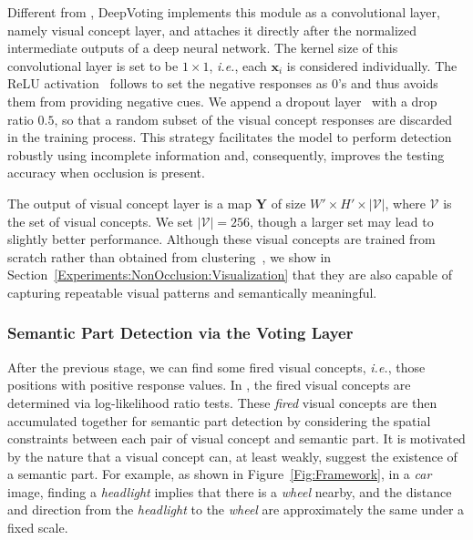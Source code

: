 \documentclass[10pt,twocolumn,letterpaper]{article}
\begin{document}
  Different from \cite{wang2017detecting}, DeepVoting implements this module as a convolutional layer, namely visual concept layer, and attaches it directly after the normalized intermediate outputs of a deep neural network. The kernel size of this convolutional layer is set to be $1\times1$, {\em i.e.}, each $\mathbf{x}_i$ is considered individually. The ReLU activation~\cite{Nair_2010_Rectified} follows to set the negative responses as $0$'s and thus avoids them from providing negative cues. We append a dropout layer~\cite{Srivastava_2014_Dropout} with a drop ratio $0.5$, so that a random subset of the visual concept responses are discarded in the training process.
  This strategy facilitates the model to perform detection robustly using incomplete information and, consequently, improves the testing accuracy when occlusion is present.

  The output of visual concept layer is a map $\mathbf{Y}$ of size $W'\times H'\times\left|\mathcal{V}\right|$, where $\mathcal{V}$ is the set of visual concepts. We set ${\left|\mathcal{V}\right|}={256}$, though a larger set may lead to slightly better performance. Although these visual concepts are trained from scratch rather than obtained from clustering~\cite{Wang_2017_VC_journal}, we show in Section~\ref{Experiments:NonOcclusion:Visualization} that they are also capable of capturing repeatable visual patterns and semantically meaningful.


  \subsubsection{Semantic Part Detection via the Voting Layer}
  \label{Framework:Formulation:Voting}

  After the previous stage, we can find some fired visual concepts, {\em i.e.}, those positions with positive response values. In \cite{wang2017detecting}, the fired visual concepts are determined via log-likelihood ratio tests. These {\em fired} visual concepts are then accumulated together for semantic part detection by considering the spatial constraints between each pair of visual concept and semantic part. It is motivated by the nature that a visual concept can, at least weakly, suggest the existence of a semantic part. For example, as shown in Figure~\ref{Fig:Framework}, in a {\em car} image, finding a {\em headlight} implies that there is a {\em wheel} nearby, and the distance and direction from the {\em headlight} to the {\em wheel} are approximately the same under a fixed scale.
\end{document}
